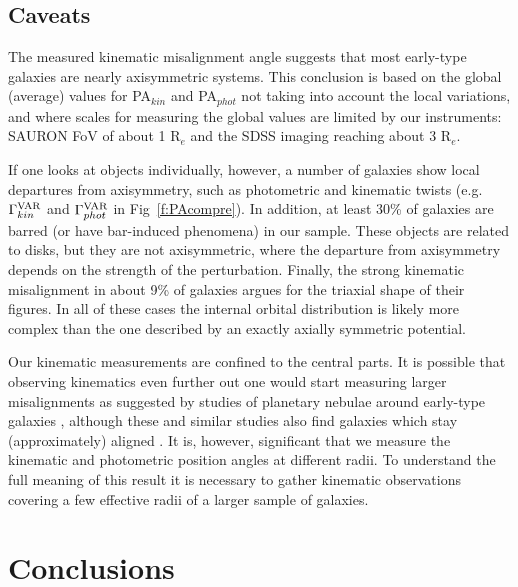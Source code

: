\documentclass[usenatbib,usegraphicx]{mn2e}
\begin{document}
\subsection{Caveats}
\label{ss:cav}

The measured kinematic misalignment angle suggests that most early-type galaxies are nearly axisymmetric systems. This conclusion is based on the global (average) values for PA$_{kin}$ and PA$_{phot}$ not taking into account the local variations, and where scales for measuring the global values are limited by our instruments: SAURON FoV of about 1 R$_{e}$ and the SDSS imaging reaching about 3 R$_{e}$. 

If one looks at objects individually, however, a number of galaxies show local departures from axisymmetry, such as photometric and kinematic twists (e.g. $\Gamma^{\rm VAR}_{kin}$ and $\Gamma^{\rm VAR}_{phot}$  in Fig~\ref{f:PAcompre}). In addition, at least  30\% of galaxies are barred (or have bar-induced phenomena) in our sample. These objects are related to disks, but they are not axisymmetric, where the departure from axisymmetry depends on the strength of the perturbation.  Finally, the strong kinematic misalignment in about 9\% of galaxies argues for the triaxial shape of their figures. In all of these cases the internal orbital distribution is likely more complex than the one described by an exactly axially symmetric potential. 

Our kinematic measurements are confined to the central parts. It is possible that observing kinematics even further out one would start measuring larger misalignments as suggested by studies of planetary nebulae around early-type galaxies \citep{2009MNRAS.394.1249C}, although these and similar studies also find galaxies which stay (approximately) aligned \citep{2009MNRAS.394.1249C,2009MNRAS.398...91P}. It is, however, significant that we measure the kinematic and photometric position angles at different radii. To  understand the full meaning of this result it is necessary to gather kinematic observations covering a few effective radii of a larger sample of galaxies.



%
%
\section{Conclusions}
\label{s:conc}
\end{document}
